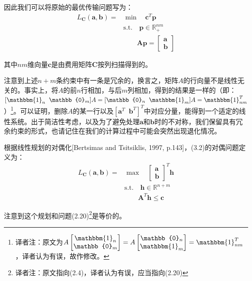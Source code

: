 \documentclass[cn,10pt,math=newtx,citestyle=gb7714-2015,bibstyle=gb7714-2015]{elegantbook}
\begin{document}
因此我们可以将原始的最优传输问题写为：
\begin{align}
    \label{3.2}
     L_\mathbf{C}(\mathbf{a,b})= &\min \quad \mathbf{c}^T\mathbf{p}\\
     &\text{s.t.} \quad \mathbf{p}\in\mathbb{R}_+^{nm} \nonumber \\ 
     & \quad \quad \mathbf{Ap}=\begin{bmatrix}\mathbf{a}\\ \mathbf{b}\end{bmatrix} \nonumber
\end{align}

其中$nm$维向量$\mathbf{c}$是由费用矩阵$\mathbf{C}$按列扫描得到的。

\begin{postulate}
注意到上述$n+m$条约束中有一条是冗余的，换言之，矩阵$A$的行向量不是线性无关的。事实上，将$A$的前$n$行相加，与后$m$列相加，得到的结果是一样的（即：$[\mathbbm{1}_n\;\;\mathbb{0}_m]A=[\mathbb{0}_n\;\;\mathbbm{1}_m]A=\mathbbm{1}_{nm}^T$）\footnote{译者注：原文为$A\begin{bmatrix}\mathbbm{1}_n\\ \mathbb{0}_m\end{bmatrix}=A\begin{bmatrix}\mathbb{0}_n\\ \mathbbm{1}_m\end{bmatrix}=\mathbbm{1}_{nm}^T$，译者认为有误，故作修改。}。可以证明，删除$A$的某一行以及$[\mathbf{a}^T\;\;\mathbf{b}^T]^T$中对应分量，能得到一个适定的线性系统。出于简洁性考虑，以及为了避免处理$\mathbf{a}$和$\mathbf{b}$时的不对称，我们保留具有冗余约束的形式，也请记住在我们的计算过程中可能会突然出现退化情况。
\end{postulate}

根据线性规划的对偶化[Bertsimas and Tsitsiklis, 1997, p.143]，(3.2)的对偶问题定义为：
\begin{align}
    \label{3.3}
     L_\mathbf{C}(\mathbf{a,b})= &\max \quad \begin{bmatrix}\mathbf{a}\\ \mathbf{b}\end{bmatrix}^T\mathbf{h}\\
     &\text{s.t.} \quad \mathbf{h}\in\mathbb{R}^{n+m} \nonumber \\ 
     & \quad \quad \mathbf{A}^T\mathbf{h}\leq \mathbf{c} \nonumber
\end{align}

注意到这个规划和问题(2.20)\footnote{译者注：原文指向(2.4)，译者认为有误，应当指向(2.20)}是等价的。
\end{document}
